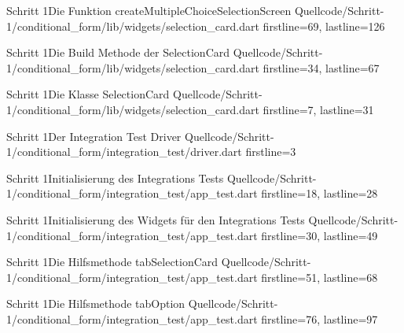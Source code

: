 {\begin{alexlisting}{Schritt 1}{Die Funktion createMultipleChoiceSelectionScreen}
  {Quellcode/Schritt-1/conditional_form/lib/widgets/selection_card.dart}
  {firstline=69, lastline=126}
  \label{lst:Schritt1FunktionCreateMultipleChoiceSelectionScreen}
\end{alexlisting}

\begin{alexlisting}{Schritt 1}{Die Build Methode der SelectionCard}
  {Quellcode/Schritt-1/conditional_form/lib/widgets/selection_card.dart}
  {firstline=34, lastline=67}
  \label{lst:Schritt1BuildMethodeDerSelectionCard}
\end{alexlisting}

\begin{alexlisting}{Schritt 1}{Die Klasse SelectionCard}
  {Quellcode/Schritt-1/conditional_form/lib/widgets/selection_card.dart}
  {firstline=7, lastline=31}
  \label{lst:Schritt1KlasseSelectionCard}
\end{alexlisting}


\begin{alexlisting}{Schritt 1}{Der Integration Test Driver}
  {Quellcode/Schritt-1/conditional_form/integration_test/driver.dart}
  {firstline=3}
  \label{lst:Schritt1IntegrationTestDriver}
\end{alexlisting}


\begin{alexlisting}{Schritt 1}{Initialisierung des Integrations Tests}
  {Quellcode/Schritt-1/conditional_form/integration_test/app_test.dart}
  {firstline=18, lastline=28}
  \label{lst:Schritt1IntegrationsTestInitialisierung}
\end{alexlisting}


\begin{alexlisting}{Schritt 1}{Initialisierung des Widgets für den Integrations Tests}
  {Quellcode/Schritt-1/conditional_form/integration_test/app_test.dart}
  {firstline=30, lastline=49}
  \label{lst:Schritt1IntegrationsTestWidgetInitialisierung}
\end{alexlisting}

\begin{alexlisting}{Schritt 1}{Die Hilfsmethode tabSelectionCard}
  {Quellcode/Schritt-1/conditional_form/integration_test/app_test.dart}
  {firstline=51, lastline=68}
  \label{lst:Schritt1HilfsmethodeTabSelectionCard}
\end{alexlisting}



\begin{alexlisting}{Schritt 1}{Die Hilfsmethode tabOption}
  {Quellcode/Schritt-1/conditional_form/integration_test/app_test.dart}
  {firstline=76, lastline=97}
  \label{lst:Schritt1HilfsmethodeTabOption}
\end{alexlisting}



}
